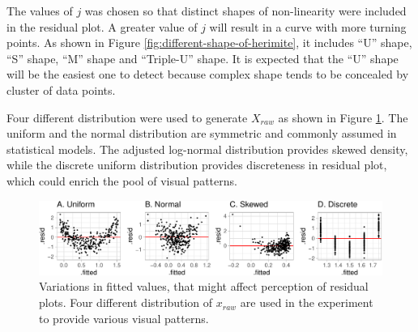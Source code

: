 \documentclass[]{interact}
\theoremstyle{plain}%
\theoremstyle{definition}
\theoremstyle{remark}
\begin{document}
\begin{table}

\caption{\label{tab:model-factor-table}Description of all factors involved in the nonlinear and heteroskedasticity studies.}
\centering
{}
\end{table}

The values of \(j\) was chosen so that distinct shapes of non-linearity
were included in the residual plot. A greater value of \(j\) will result
in a curve with more turning points. As shown in Figure
\ref{fig:different-shape-of-herimite}, it includes ``U'' shape, ``S''
shape, ``M'' shape and ``Triple-U'' shape. It is expected that the ``U''
shape will be the easiest one to detect because complex shape tends to
be concealed by cluster of data points.

Four different distribution were used to generate \(X_{raw}\) as shown
in Figure \ref{fig:different-dist}. The uniform and the normal
distribution are symmetric and commonly assumed in statistical models.
The adjusted log-normal distribution provides skewed density, while the
discrete uniform distribution provides discreteness in residual plot,
which could enrich the pool of visual patterns.

\begin{figure}

{\centering \includegraphics[width=1\linewidth]{paper_comparison_files/figure-latex/different-dist-1} 

}

\caption{Variations in fitted values, that might affect perception of residual plots. Four different distribution of $x_{raw}$ are used in the experiment to provide various visual patterns.}\label{fig:different-dist}
\end{figure}
\end{document}
